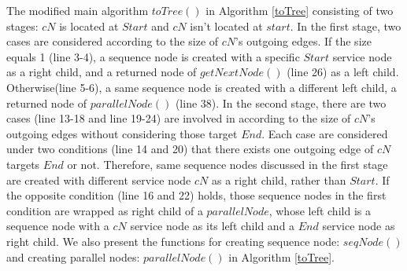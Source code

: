 The modified main algorithm $toTree()$ in Algorithm \ref{toTree} consisting of two stages: $cN$ is located at $Start$ and $cN$ isn't located at $start$. In the first stage, two cases are considered according to the size of $cN$'s outgoing edges. If the size equals 1 (line 3-4), a sequence node is created with a specific $Start$ service node as a right child, and a returned node of $getNextNode()$ (line 26) as a left child. Otherwise(line 5-6), a same sequence node is created with a different left child, a returned node of $parallelNode()$ (line 38). In the second stage, there are two cases (line 13-18 and line 19-24) are involved in according to the size of $cN$'s outgoing edges without considering those target $End$. Each case are considered under two conditions (line 14 and 20) that there exists one outgoing edge of $cN$ targets $End$ or not. Therefore, same sequence nodes discussed in the first stage are created with different service node $cN$ as a right child, rather than $Start$. If the opposite condition  (line 16 and 22) holds, those sequence nodes in the first condition are wrapped as right child of a $parallelNode$, whose left child is a sequence node with a $cN$ service node as its left child and a $End$ service node as right child. We also present the functions for creating sequence node: $seqNode()$ and creating parallel nodes: $parallelNode()$ in Algorithm \ref{toTree}.
